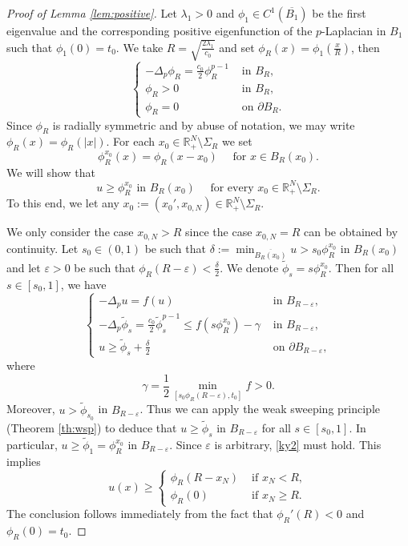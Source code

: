 \documentclass[reqno]{amsart}
\theoremstyle{plain}
\theoremstyle{definition}
\theoremstyle{remark}
\begin{document}
	\begin{proof}[Proof of Lemma \ref{lem:positive}]
		Let $\lambda_1>0$ and $\phi_1 \in C^1(\overline{B_1})$ be the first eigenvalue and the corresponding positive eigenfunction of the $p$-Laplacian in $B_1$ such that $\phi_1(0)=t_0$. We take $R=\sqrt{\frac{2\lambda_1}{c_0}}$ and set $\phi_R(x) = \phi_1\left(\frac{x}{R}\right)$, then
		\[
		\begin{cases}
			-\Delta_p \phi_R = \frac{c_0}{2} \phi_R^{p-1} & \text{ in } B_R,\\
			\phi_R > 0 & \text{ in } B_R,\\
			\phi_R = 0 & \text{ on } \partial B_R.
		\end{cases}
		\]
		Since $\phi_R$ is radially symmetric and by abuse of notation, we may write $\phi_R(x)=\phi_R(|x|)$.
		For each $x_0\in\mathbb{R}^N_+\setminus\Sigma_R$ we set
		\[
		\phi_R^{x_0}(x) = \phi_R(x - x_0) \quad\text{ for } x \in B_R(x_0).
		\]
		We will show that
		\begin{equation}\label{ky2}
			u \ge \phi_R^{x_0} \text{ in } B_R(x_0) \quad\text{ for every } x_0\in\mathbb{R}^N_+\setminus\Sigma_R.
		\end{equation}
		To this end, we let any $x_0:=(x_0', x_{0,N})\in\mathbb{R}^N_+\setminus\Sigma_R$.
		
		We only consider the case $x_{0,N}>R$ since the case $x_{0,N}=R$ can be obtained by continuity. Let $s_0\in(0,1)$ be such that $\delta:=\min_{\overline{B_R(x_0)}} u > s_0\phi_R^{x_0}$ in $B_R(x_0)$ and let $\varepsilon>0$ be such that $\phi_R(R-\varepsilon) < \frac{\delta}{2}$. We denote $\tilde{\phi}_s=s\phi_R^{x_0}$. Then for all $s \in [s_0, 1]$, we have
		\[
		\begin{cases}
			-\Delta_p u = f(u) & \text{ in } B_{R-\varepsilon},\\
			-\Delta_p \tilde{\phi}_s = \frac{c_0}{2} \tilde{\phi}_s^{p-1} \le f(s\phi_R^{x_0}) - \gamma & \text{ in } B_{R-\varepsilon},\\
			u \ge \tilde{\phi}_s + \frac{\delta}{2} & \text{ on } \partial B_{R-\varepsilon},
		\end{cases}
		\]
		where
		\[
		\gamma=\frac{1}{2}\min_{[s_0\phi_R(R-\varepsilon),t_0]} f>0.
		\]
		Moreover, $u > \tilde{\phi}_{s_0}$ in $B_{R-\varepsilon}$. Thus we can apply the weak sweeping principle (Theorem \ref{th:wsp}) to deduce that $u \ge \tilde{\phi}_s$ in $B_{R-\varepsilon}$ for all $s \in [s_0, 1]$. In particular, $u \ge \tilde{\phi}_1 = \phi_R^{x_0}$ in $B_{R-\varepsilon}$. Since $\varepsilon$ is arbitrary, \eqref{ky2} must hold. This implies
		\[
		u(x) \ge \begin{cases}
			\phi_R(R-x_N) &\text{ if } x_N< R,\\
			\phi_R(0) &\text{ if } x_N\ge R.
		\end{cases}
		\]
		The conclusion follows immediately from the fact that $\phi_R'(R)<0$ and $\phi_R(0)=t_0$.
	\end{proof}
	
\end{document}
